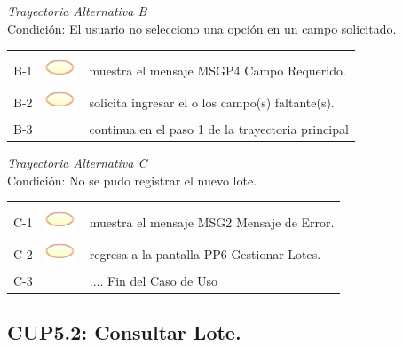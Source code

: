 \documentclass[10pt,spanish]{article}
\providecommand{\tabularnewline}{\\}
\begin{document}
	\textit{Trayectoria Alternativa B}\\
	Condición: El usuario no selecciono una opción en un campo solicitado.\\
	\begin{tabular}{ccl}
	& & \tabularnewline
	B-1 & \includegraphics{sistema} & muestra el mensaje MSGP4 Campo Requerido.\tabularnewline	
	B-2 & \includegraphics{sistema} & solicita ingresar el o los campo(s) faltante(s).\tabularnewline		
	B-3 & & continua en el paso 1 de la trayectoria principal\tabularnewline
	\end{tabular}	
	
	\textit{Trayectoria Alternativa C}\\
	Condición: No se pudo registrar el nuevo lote.\\
	\begin{tabular}{ccl}
	& & \tabularnewline
	C-1 & \includegraphics{sistema} & muestra el mensaje MSG2 Mensaje de Error.\tabularnewline	
	C-2 & \includegraphics{sistema} & regresa a la pantalla PP6 Gestionar Lotes.\tabularnewline		
	C-3 & & .... Fin del Caso de Uso\tabularnewline
	\end{tabular}			
	\newpage
	\subsection{CUP5.2: Consultar Lote.}
\end{document}
